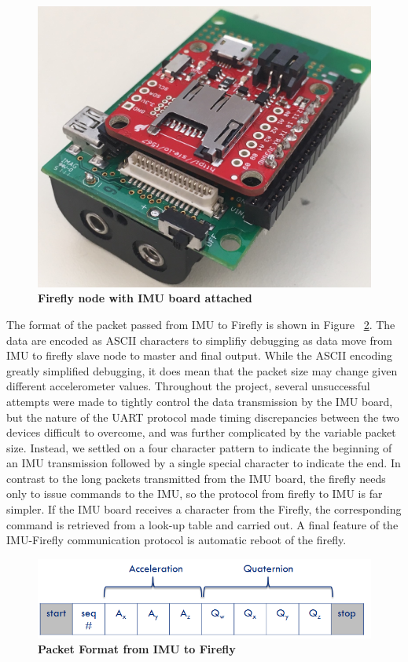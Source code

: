 \documentclass[conference]{IEEEtran}
\begin{document}
\begin{figure}[ht]
  \centering
  \includegraphics[width=0.75\columnwidth]{figs/cropped2}
  \caption{{\bf Firefly node with IMU board attached}}
  \label{fig:ff}
\end{figure}

  The format of the packet passed from IMU to Firefly is shown in
Figure ~\ref{fig:packet}. The data are encoded as ASCII characters to simplifiy debugging
as data move from IMU to firefly slave node to master and final output. While the ASCII
encoding greatly simplified debugging, it does mean that the packet size may change given
different accelerometer values.  Throughout the project, several unsuccessful attempts
were made to tightly control the data transmission by the IMU board, but the nature of the
UART protocol made timing discrepancies between the two devices difficult to overcome, and
was further complicated by the variable packet size. Instead, we settled on a four
character pattern to indicate the beginning of an IMU transmission followed by a single
special character to indicate the end. In contrast to the long packets transmitted from
the IMU board, the firefly needs only to issue commands to the IMU, so the protocol from
firefly to IMU is far simpler. If the IMU board receives a character from the Firefly, the
corresponding command is retrieved from a look-up table and carried out. A final feature
of the IMU-Firefly communication protocol is automatic reboot of the firefly. 

\begin{figure}[h]
  \centering
  \includegraphics[width=0.8\columnwidth]{figs/packet}
  \caption{{\bf Packet Format from IMU to Firefly}}
  \label{fig:packet}
\end{figure}
\end{document}
